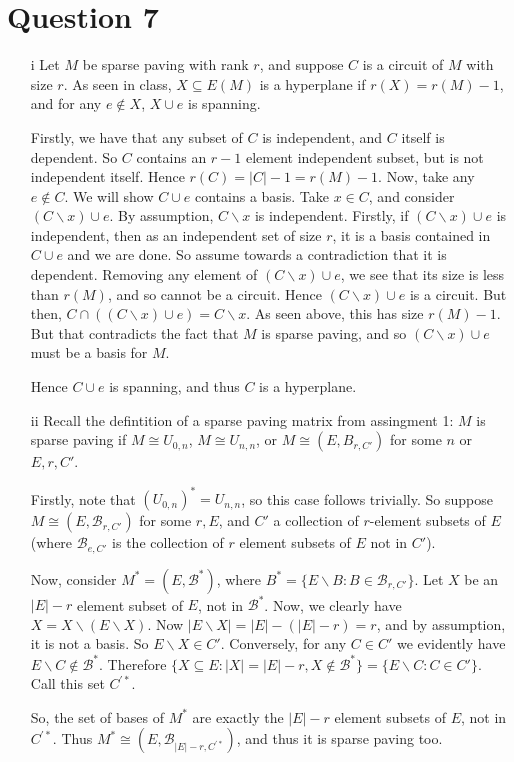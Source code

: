 \documentclass{article}
\begin{document}
\section*{Question 7}
\begin{enumerate}
    \item[i] Let $M$ be sparse paving with rank $r$, and suppose $C$ is a circuit of $M$ with size $r$.
        As seen in class, $X\subseteq E(M)$ is a hyperplane if $r(X)=r(M)-1$, and for any $e\not\in X$, $X\cup e$ is spanning.

        Firstly, we have that any subset of $C$ is independent, and $C$ itself is dependent. So $C$ contains an $r-1$ element 
        independent subset, but is not independent itself. Hence $r(C)=|C|-1=r(M)-1$.
        Now, take any $e\not\in C$. We will show $C\cup e$ contains a basis. Take $x\in C$, and consider $(C\backslash x)\cup e$.
        By assumption, $C\backslash x$ is independent. 
        Firstly, if $(C\backslash x)\cup e$ is independent, then as an independent set of size $r$, it is a basis contained in $C\cup e$
        and we are done.
        So assume towards a contradiction that it is dependent. 
        Removing any element of $(C\backslash x)\cup e$, we see that its size is less than $r(M)$,
        and so cannot be a circuit. Hence $(C\backslash x)\cup e$ is a circuit.
        But then, $C\cap ((C\backslash x)\cup e)=C\backslash x$. As seen above, this has size $r(M)-1$. 
        But that contradicts the fact that $M$ is sparse paving, and so $(C\backslash x)\cup e$ must be a basis for $M$.

        Hence $C\cup e$ is spanning, and thus $C$ is a hyperplane.

    \item[ii] 
        Recall the defintition of a sparse paving matrix from assingment 1:
        $M$ is sparse paving if $M\cong U_{0, n}$, $M\cong U_{n, n}$, or $M\cong(E, B_{r, C'})$ for some $n$ or $E, r, C'$.

        Firstly, note that $(U_{0, n})^*=U_{n, n}$, so this case follows trivially. 
        So suppose $M\cong(E, \mathcal{B}_{r, C'})$ for some $r, E$, and $C'$ a collection of $r$-element subsets of $E$
        (where $\mathcal{B}_{e, C'}$ is the collection of $r$ element subsets of $E$ not in $C'$).

        Now, consider $M^*=(E, \mathcal{B}^*)$, where $B^*=\{E\backslash B: B\in \mathcal{B}_{r, C'}\}$. Let $X$ be an $|E|-r$ element subset of $E$, not in $\mathcal{B}^*$.
        Now, we clearly have $X= X\backslash (E\backslash X)$. Now $|E\backslash X|=|E|-(|E|-r)=r$, and by assumption, it is not a basis.
        So $E\backslash X\in C'$. Conversely, for any $C\in C'$ we evidently have $E\backslash C\not\in \mathcal{B}^*$.
        Therefore $\{X\subseteq E: |X|=|E|-r, X\not\in \mathcal{B}^*\}=\{E\backslash C: C\in C'\}$. Call this set $C^{\prime *}$.

        So, the set of bases of $M^*$ are exactly the $|E|-r$ element subsets of $E$, not in $C^{\prime *}$.
        Thus $M^*\cong (E, \mathcal{B}_{|E|-r, C^{\prime *}})$, and thus it is sparse paving too.
\end{enumerate}
\end{document}

